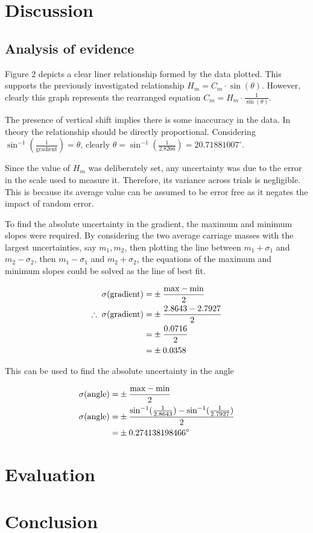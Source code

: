 \documentclass[11pt,a4paper]{article}
\begin{document}
\section{Discussion}
\subsection{Analysis of evidence}
Figure 2 depicts a clear liner relationship formed by the data plotted. This supports the previously investigated relationship  $H_m=C_m\cdot{\sin(\theta)}$. However, clearly this graph represents the rearranged equation $C_m=H_m\cdot \frac{1}{{\sin(\theta)}}$.

The presence of vertical shift implies there is some inaccuracy in the data. In theory the relationship should be directly proportional. Considering
 $\sin^{-1}\left(\frac{1}{\textrm{gradient}}\right)=\theta$, clearly $\theta = \sin^{-1}\left(\frac{1}{2.8266}\right)=20.71881007^\circ$.
 

Since the value of $H_m$ was deliberately set, any uncertainty was due to the error in the scale used to measure it. Therefore, its variance across trials is negligible. This is because its average value can be assumed to be error free as it negates the impact of random error.

To find the absolute uncertainty in the gradient, the maximum and minimum slopes were required. By considering the two average carriage masses with the largest uncertainties, say $m_1, m_2$, then plotting the line between $m_1+\sigma_1$ and $m_2-\sigma_2$, then  $m_1-\sigma_1$ and $m_2+\sigma_2$, the equations of the maximum and minimum slopes could be solved as the line of best fit.


\begin{align*}
	\centering
	\sigma(\textrm{gradient})=&\pm\frac{\textrm{max}-\textrm{min}}{2}\\
	\therefore\;\sigma(\textrm{gradient})=&\pm\frac{2.8643-2.7927}{2}\\
	=&\pm\frac{0.0716}{2}\\
	=&\pm0.0358
\end{align*}

This can be used to find the absolute uncertainty in the angle

\begin{align*}
	\centering
	\sigma(\textrm{angle})=&\pm\frac{\textrm{max}-\textrm{min}}{2}\\
	\sigma(\textrm{angle})=&\pm\frac{\sin^{-1}(\frac{1}{2.8643})-\sin^{-1}(\frac{1}{2.7927})}{2}\\
	=&\pm0.274138198466^\circ
	\end{align*}

\section{Evaluation}


\section{Conclusion}
\newpage



	
\end{document}
